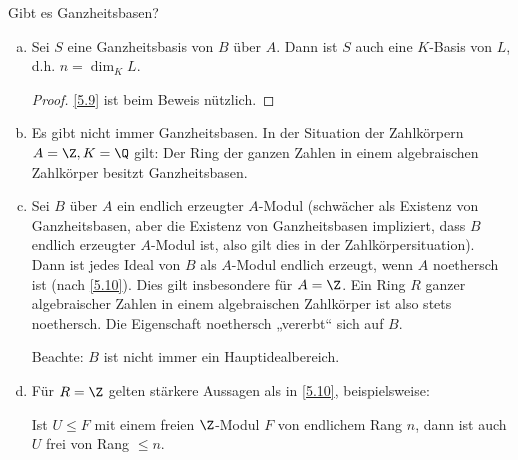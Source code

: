 Gibt es Ganzheitsbasen?

\begin{nt} \label{5.13}
	\begin{enumerate}[a)]
		\item
			Sei $S$ eine Ganzheitsbasis von $B$ über $A$.
			Dann ist $S$ auch eine $K$-Basis von $L$, d.h. $n = \dim_K L$.
			\begin{proof}
				\ref{5.9} ist beim Beweis nützlich. \Exercise
			\end{proof}
		\item
			Es gibt nicht immer Ganzheitsbasen.
			In der Situation der Zahlkörpern $A = \Z, K = \Q$ gilt:
			Der Ring der ganzen Zahlen in einem algebraischen Zahlkörper besitzt Ganzheitsbasen.
		\item
			Sei $B$ über $A$ ein endlich erzeugter $A$-Modul (schwächer als Existenz von Ganzheitsbasen, aber die Existenz von Ganzheitsbasen impliziert, dass $B$ endlich erzeugter $A$-Modul ist, also gilt dies in der Zahlkörpersituation).
			Dann ist jedes Ideal von $B$ als $A$-Modul endlich erzeugt, wenn $A$ noethersch ist (nach \ref{5.10}).
			Dies gilt insbesondere für $A = \Z$.
			Ein Ring $R$ ganzer algebraischer Zahlen in einem algebraischen Zahlkörper ist also stets noethersch.
			Die Eigenschaft noethersch „vererbt“ sich auf $B$.

			Beachte: $B$ ist nicht immer ein Hauptidealbereich.
		\item
			Für $R = \Z$ gelten stärkere Aussagen als in \ref{5.10}, beispielsweise:

			Ist $U \le F$ mit einem freien $\Z$-Modul $F$ von endlichem Rang $n$, dann ist auch $U$ frei von Rang $\le n$.
	\end{enumerate}

\end{nt}

